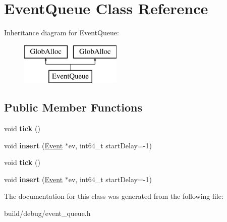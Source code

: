 \hypertarget{classEventQueue}{\section{Event\-Queue Class Reference}
\label{classEventQueue}
}
Inheritance diagram for Event\-Queue\-:\begin{figure}[H]
\begin{center}
\leavevmode
\includegraphics[height=2.000000cm]{classEventQueue}
\end{center}
\end{figure}
\subsection*{Public Member Functions}
\begin{DoxyCompactItemize}
\item 
\hypertarget{classEventQueue_afe0fdec3ed03ebe47b84e62b22842792}{void {\bfseries tick} ()}\label{classEventQueue_afe0fdec3ed03ebe47b84e62b22842792}

\item 
\hypertarget{classEventQueue_ab1d640e2257550aec21cc953fb524ac2}{void {\bfseries insert} (\hyperlink{classEvent}{Event} $\ast$ev, int64\-\_\-t start\-Delay=-\/1)}\label{classEventQueue_ab1d640e2257550aec21cc953fb524ac2}

\item 
\hypertarget{classEventQueue_afe0fdec3ed03ebe47b84e62b22842792}{void {\bfseries tick} ()}\label{classEventQueue_afe0fdec3ed03ebe47b84e62b22842792}

\item 
\hypertarget{classEventQueue_ab1d640e2257550aec21cc953fb524ac2}{void {\bfseries insert} (\hyperlink{classEvent}{Event} $\ast$ev, int64\-\_\-t start\-Delay=-\/1)}\label{classEventQueue_ab1d640e2257550aec21cc953fb524ac2}

\end{DoxyCompactItemize}


The documentation for this class was generated from the following file\-:\begin{DoxyCompactItemize}
\item 
build/debug/event\-\_\-queue.\-h\end{DoxyCompactItemize}
